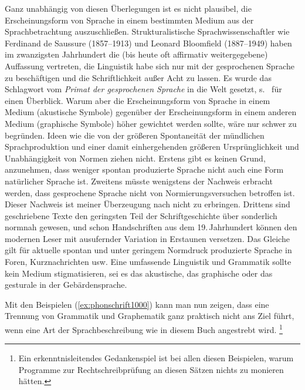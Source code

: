 Ganz unabhängig von diesen Überlegungen ist es nicht plausibel, die Erscheinungsform von Sprache in einem bestimmten Medium aus der Sprachbetrachtung auszuschließen.
Strukturalistische Sprachwissenschaftler wie Ferdinand de Saussure (1857--1913) und Leonard Bloomfield (1887--1949) haben im zwanzigsten Jahrhundert die (bis heute oft affirmativ weitergegebene) Auffassung vertreten, die Linguistik habe sich nur mit der gesprochenen Sprache zu beschäftigen und die Schriftlichkeit außer Acht zu lassen.
Es wurde das Schlagwort vom \textit{Primat der gesprochenen Sprache} in die Welt gesetzt, s.\ \cite[Kapitel~0]{Duerscheid2012} für einen Überblick.
Warum aber die Erscheinungsform von Sprache in einem Medium (akustische Symbole) gegenüber der Erscheinungsform in einem anderen Medium (graphische Symbole) höher gewichtet werden sollte, wäre nur schwer zu begründen.
Ideen wie die von der größeren Spontaneität der mündlichen Sprachproduktion und einer damit einhergehenden größeren Ursprünglichkeit und Unabhängigkeit von Normen ziehen nicht.
Erstens gibt es keinen Grund, anzunehmen, dass weniger spontan produzierte Sprache nicht auch eine Form natürlicher Sprache ist.
Zweitens müsste wenigstens der Nachweis erbracht werden, dass gesprochene Sprache nicht von Normierungsversuchen betroffen ist.
Dieser Nachweis ist meiner Überzeugung nach nicht zu erbringen.
Drittens sind geschriebene Texte den geringsten Teil der Schriftgeschichte über sonderlich normnah gewesen, und schon Handschriften aus dem 19.\,Jahrhundert können den modernen Leser mit ausufernder Variation in Erstaunen versetzen.
Das Gleiche gilt für aktuelle spontan und unter geringem Normdruck produzierte Sprache in Foren, Kurznachrichten usw.
Eine umfassende Linguistik und Grammatik sollte kein Medium stigmatisieren, sei es das akustische, das graphische oder \zB das gesturale in der Gebärdensprache.

Mit den Beispielen (\ref{ex:phonschrift1000}) kann man nun zeigen, dass eine Trennung von Grammatik und Graphematik ganz praktisch nicht ans Ziel führt, wenn eine Art der Sprachbeschreibung wie in diesem Buch angestrebt wird.%
\footnote{Ein erkenntnisleitendes Gedankenspiel ist bei allen diesen Beispielen, warum Programme zur Rechtschreibprüfung an diesen Sätzen nichts zu monieren hätten.}

\begin{exe}
  \ex\label{ex:phonschrift1000} 
  \begin{xlist}
  \end{xlist}
\end{exe}

